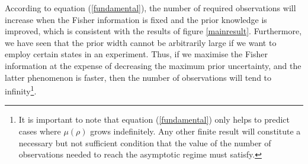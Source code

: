 According to equation (\ref{fundamental}), the number of required observations will increase when the Fisher information is fixed and the prior knowledge is improved, which is consistent with the results of figure \ref{mainresult}. Furthermore, we have seen that the prior width cannot be arbitrarily large if we want to employ certain states in an experiment. Thus, if we maximise the Fisher information at the expense of decreasing the maximum prior uncertainty, and the latter phenomenon is faster, then the number of observations will tend to infinity\footnote{It is important to note that equation (\ref{fundamental}) only helps to predict cases where $\mu(\rho)$ grows indefinitely. Any other finite result will constitute a necessary but not sufficient condition that the value of the number of observations needed to reach the asymptotic regime must satisfy.}.

